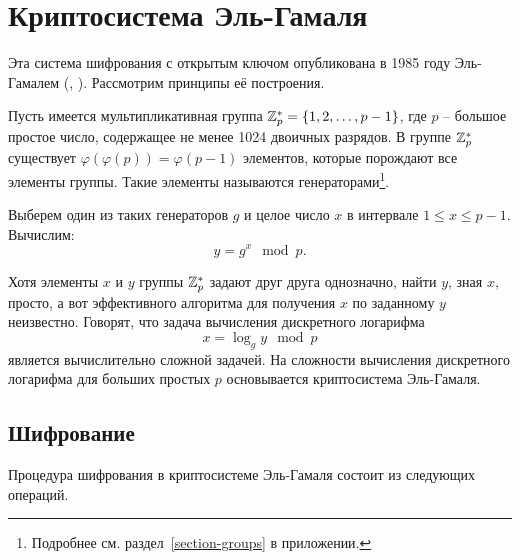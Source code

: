 \section{Криптосистема Эль-Гамаля}

Эта система шифрования с открытым ключом опубликована в 1985 году Эль-Гамалем (, \cite{ElGamal:1985}). Рассмотрим принципы её построения.

Пусть имеется мультипликативная группа $\mathbb{Z}_p^* = \{1, 2, \dots, p-1\}$, где $p$ -- большое простое число, содержащее не менее 1024 двоичных разрядов. В группе $\mathbb{Z}_p^*$ существует $\varphi( \varphi( p ) ) = \varphi( p - 1 )$ элементов, которые порождают все элементы группы. Такие элементы называются генераторами\footnote{Подробнее см. раздел~\ref{section-groups} в приложении.}.

Выберем один из таких генераторов $g$ и целое число $x$ в интервале $1 \leq x \leq p-1$. Вычислим:
    \[ y = g^x \mod p. \]

Хотя элементы $x$ и $y$ группы $\mathbb{Z}_p^*$ задают друг друга однозначно, найти $y$, зная $x$, просто, а вот эффективного алгоритма для получения $x$ по заданному $y$ неизвестно. Говорят, что задача вычисления дискретного логарифма
	\[ x = \log_g y \mod p \]
является вычислительно сложной задачей. На сложности вычисления дискретного логарифма для больших простых $p$ основывается криптосистема Эль-Гамаля.

\subsection{Шифрование}

Процедура шифрования в криптосистеме Эль-Гамаля состоит из следующих операций.


